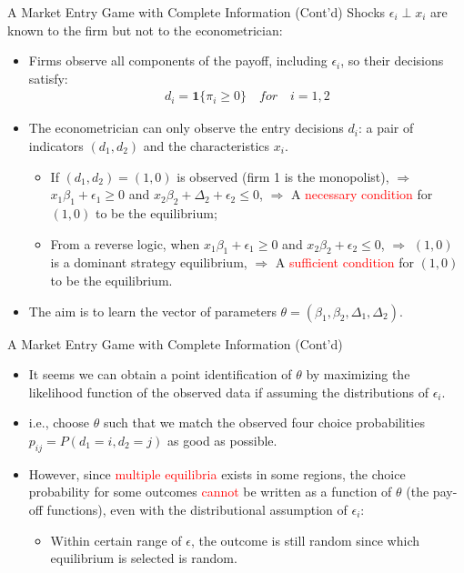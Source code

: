 \documentclass[aspectratio=169]{beamer}  %
\begin{document}
\begin{frame}{A Market Entry Game with Complete Information (Cont'd)}
Shocks $\epsilon_i \perp  x_i$ are known to the firm but not to the econometrician:
\begin{itemize}
    \item Firms observe all components of the payoff, including $\epsilon_i$, so their decisions satisfy:
    \begin{align*}
        d_i = \mathbf{1}\{\pi_i \geq 0\} \quad for \quad i = 1, 2
    \end{align*}
    \item The econometrician can only observe the entry decisions $d_i$: a pair of indicators $(d_1, d_2)$ and the characteristics $x_i$.
    \begin{itemize}
        \item If $(d_1, d_2) = (1, 0)$ is observed (firm 1 is the monopolist), $\Rightarrow$ $x_1\beta_1 + \epsilon_1 \geq 0$ and $x_2 \beta_2 + \Delta_2 + \epsilon_2 \leq 0$, $\Rightarrow$ A \textcolor{red}{necessary condition} for $(1, 0)$ to be the equilibrium;
        \item From a reverse logic, when $x_1\beta_1 + \epsilon_1 \geq 0$ and $x_2 \beta_2 + \epsilon_2 \leq 0$, $\Rightarrow$ $(1, 0)$ is a dominant strategy equilibrium, $\Rightarrow$ A \textcolor{red}{sufficient condition} for $(1, 0)$ to be the equilibrium.
    \end{itemize}
    \item The aim is to learn the vector of parameters $\theta = (\beta_1, \beta_2, \Delta_1, \Delta_2)$.

\end{itemize}
\end{frame}

\begin{frame}{A Market Entry Game with Complete Information (Cont'd)}
\begin{itemize}
    \item It seems we can obtain a point identification of $\theta$ by maximizing the likelihood function of the observed data if assuming the distributions of $\epsilon_i$.
    \item i.e., choose $\theta$ such that we match the observed four choice probabilities $p_{ij} = P(d_1 = i, d_2 = j)$ as good as possible.
    \item However, since \textcolor{red}{multiple equilibria} exists in some regions, the choice probability for some outcomes \textcolor{red}{cannot} be written as a function of $\theta$ (the pay-off functions), even with the distributional assumption of $\epsilon_i$:
    \begin{itemize}    
        \item Within certain range of $\epsilon$, the outcome is still random since which equilibrium is selected is random.
    \end{itemize}
\end{itemize}
\end{frame}
\end{document}
